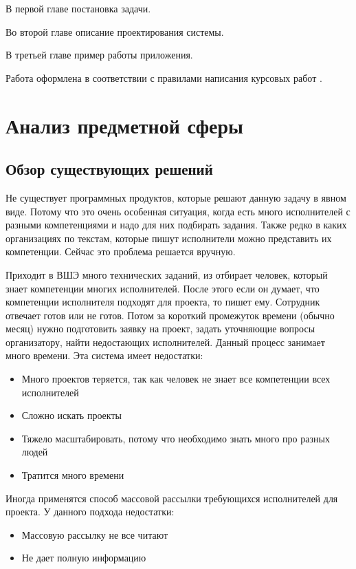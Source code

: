 \documentclass[PI,KR]{HSEUniversity}
\begin{document}
В первой главе постановка задачи.

Во второй главе описание проектирования системы.

В третьей главе пример работы приложения.

Работа оформлена в соответствии с правилами написания курсовых работ \cite{HSEDocuments}.
\chapter{Анализ предметной сферы}
\section{Обзор существующих решений}
Не существует программных продуктов, которые решают данную задачу в явном виде. Потому что это очень особенная ситуация, когда есть много исполнителей с разными компетенциями и надо для них подбирать задания. Также редко в каких организациях по текстам, которые пишут исполнители можно представить их компетенции. Сейчас это проблема решается вручную.

Приходит в ВШЭ много технических заданий, из отбирает человек, который знает компетенции многих исполнителей. После этого если он думает, что компетенции исполнителя подходят для проекта, то пишет ему. Сотрудник отвечает готов или не готов. Потом за короткий промежуток времени (обычно месяц) нужно подготовить заявку на проект, задать уточняющие вопросы организатору, найти недостающих исполнителей. Данный процесс занимает много времени. Эта система имеет недостатки:
\begin{itemize}
	\item Много проектов теряется, так как человек не знает все компетенции всех исполнителей
	\item Сложно искать проекты
	\item Тяжело масштабировать, потому что необходимо знать много про разных людей
	\item Тратится много времени
\end{itemize}

Иногда применятся способ массовой рассылки требующихся исполнителей для проекта. У данного подхода недостатки: 
\begin{itemize}
	\item Массовую рассылку не все читают
	\item Не дает полную информацию
\end{itemize}
\end{document}

